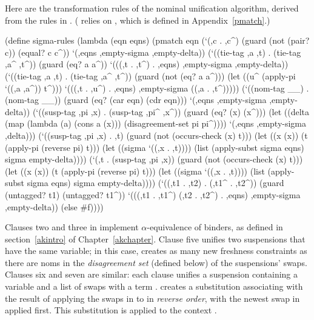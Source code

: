 Here are the transformation rules of the nominal unification
algorithm, derived from the rules in \citet{Urban-Pitts-Gabbay/04}.
( relies on , which is defined in
Appendix~\ref{pmatch}.)

\newpage

\schemedisplayspace
\begin{schemedisplay}
(define sigma-rules  
  (lambda (eqn eqns)
    (pmatch eqn
      (`(,c . ,c^)
       (guard (not (pair? c)) (equal? c c^))
       `(,eqns ,empty-sigma ,empty-delta))
      (`((tie-tag ,a ,t) . (tie-tag ,a^ ,t^))
       (guard (eq? a a^))
       `(((,t . ,t^) . ,eqns) ,empty-sigma ,empty-delta))
      (`((tie-tag ,a ,t) . (tie-tag ,a^ ,t^))
       (guard (not (eq? a a^)))
       (let ((u^ (apply-pi `((,a ,a^)) t^)))
         `(((,t . ,u^) . ,eqns) ,empty-sigma ((,a . ,t^)))))
      (`((nom-tag __) . (nom-tag __))
       (guard (eq? (car eqn) (cdr eqn)))
       `(,eqns ,empty-sigma ,empty-delta))
      (`((susp-tag ,pi ,x) . (susp-tag ,pi^ ,x^))
       (guard (eq? (x) (x^)))
       (let ((delta (map (lambda (a) (cons a (x))) 
                         (disagreement-set pi pi^))))
         `(,eqns ,empty-sigma ,delta)))
      (`((susp-tag ,pi ,x) . ,t)
       (guard (not (occurs-check (x) t)))
       (let ((x (x)) (t (apply-pi (reverse pi) t)))
         (let ((sigma `((,x . ,t))))
           (list (apply-subst sigma eqns) sigma empty-delta))))
      (`(,t . (susp-tag ,pi ,x))
       (guard (not (occurs-check (x) t)))
       (let ((x (x)) (t (apply-pi (reverse pi) t)))
         (let ((sigma `((,x . ,t))))
           (list (apply-subst sigma eqns) sigma empty-delta))))
      (`((,t1 . ,t2) . (,t1^ . ,t2^))
       (guard (untagged? t1) (untagged? t1^))
       `(((,t1 . ,t1^) (,t2 . ,t2^) . ,eqns) ,empty-sigma ,empty-delta))
      (else #f))))
\end{schemedisplay}

Clauses two and three in 
implement $\alpha$-equivalence of binders, as defined
in section~\ref{akintro} of Chapter~\ref{akchapter}.
Clause five unifies two suspensions that have the same variable;
in this case,  creates as many new freshness constraints
as there are noms in the \emph{disagreement set} (defined below) of the
suspensions' swaps.
Clauses six and seven are similar: each clause unifies a
suspension containing a variable  and a list of swaps 
with a term .
 creates a substitution associating
 with the result of applying the swaps in  to  in
\emph{reverse order}, with the newest swap in  applied first.
This substitution is applied to the context .

